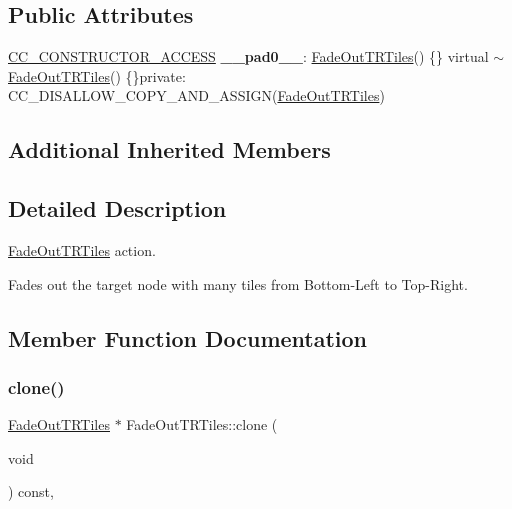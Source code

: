 \subsection*{Public Attributes}
\begin{DoxyCompactItemize}
\item 
\mbox{\label{classFadeOutTRTiles_a058cd71060b8788f9be41a3459887afe}} 
\hyperlink{_2cocos2d_2cocos_2base_2ccConfig_8h_a25ef1314f97c35a2ed3d029b0ead6da0}{C\+C\+\_\+\+C\+O\+N\+S\+T\+R\+U\+C\+T\+O\+R\+\_\+\+A\+C\+C\+E\+SS} {\bfseries \+\_\+\+\_\+pad0\+\_\+\+\_\+}\+: \hyperlink{classFadeOutTRTiles}{Fade\+Out\+T\+R\+Tiles}() \{\} virtual $\sim$\hyperlink{classFadeOutTRTiles}{Fade\+Out\+T\+R\+Tiles}() \{\}private\+: C\+C\+\_\+\+D\+I\+S\+A\+L\+L\+O\+W\+\_\+\+C\+O\+P\+Y\+\_\+\+A\+N\+D\+\_\+\+A\+S\+S\+I\+GN(\hyperlink{classFadeOutTRTiles}{Fade\+Out\+T\+R\+Tiles})
\end{DoxyCompactItemize}
\subsection*{Additional Inherited Members}


\subsection{Detailed Description}
\hyperlink{classFadeOutTRTiles}{Fade\+Out\+T\+R\+Tiles} action. 

Fades out the target node with many tiles from Bottom-\/\+Left to Top-\/\+Right. 

\subsection{Member Function Documentation}
\mbox{\label{classFadeOutTRTiles_af7a6bf6cfa4ef6cccae911b026e49b48}} 
\subsubsection{\texorpdfstring{clone()}{clone()}\hspace{0.1cm}{\footnotesize\ttfamily [1/2]}}
{\footnotesize\ttfamily \hyperlink{classFadeOutTRTiles}{Fade\+Out\+T\+R\+Tiles} $\ast$ Fade\+Out\+T\+R\+Tiles\+::clone (\begin{DoxyParamCaption}\item[{void}]{ }\end{DoxyParamCaption}) const\hspace{0.3cm}{\ttfamily [override]}, {\ttfamily [virtual]}}


